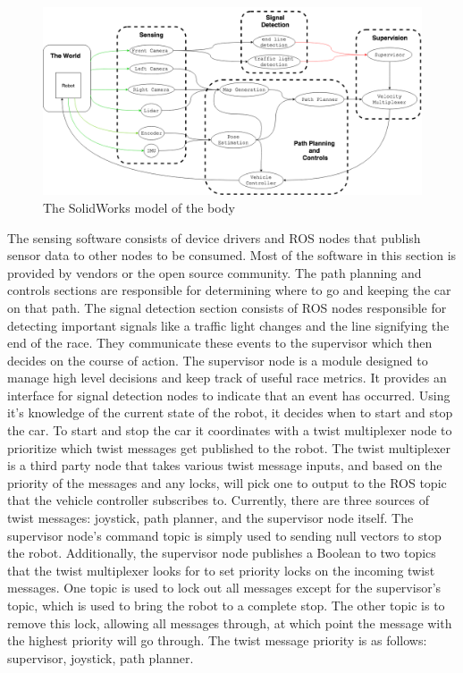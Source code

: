 \documentclass[11pt,journal]{IEEEtran}
\begin{document}
\begin{figure}[ht]
\centerline{\includegraphics[width=2\columnwidth]{CodeStructure.png}}
\caption{The SolidWorks model of the body}
\label{Body1}
\end{figure}
The sensing software consists of device drivers and ROS nodes that publish sensor data to other nodes to be consumed. Most of the software in this section is provided by vendors or the open source community.
The path planning and controls sections are responsible for determining where to go and keeping the car on that path.
The signal detection section consists of ROS nodes responsible for detecting important signals like a traffic light changes and the line signifying the end of the race. They communicate these events to the supervisor which then decides on the course of action.
The supervisor node is a module designed to manage high level decisions and keep track of useful race metrics. It provides an interface for signal detection nodes to indicate that an event has occurred. Using it's knowledge of the current state of the robot, it decides when to start and stop the car. To start and stop the car it coordinates with a twist multiplexer node to prioritize which twist messages get published to the robot. The twist multiplexer is a third party node  that takes various twist message inputs, and based on the priority of the messages and any locks, will pick one to output to the ROS topic that the vehicle controller subscribes to. Currently, there are three sources of twist messages: joystick, path planner, and the supervisor node itself. The supervisor node's command topic is simply used to sending null vectors to stop the robot. Additionally, the supervisor node publishes a Boolean to two topics that the twist multiplexer looks for to set priority locks on the incoming twist messages. One topic is used to lock out all messages except for the supervisor's topic, which is used to bring the robot to a complete stop. The other topic is to remove this lock, allowing all messages through, at which point the message with the highest priority will go through. The twist message priority is as follows: supervisor, joystick, path planner.
\end{document}
